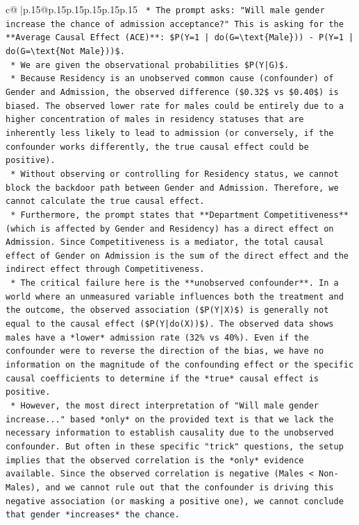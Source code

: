 \documentclass{article}
\begin{document}
{\begin{supertabular}{c@{$\;$}|p{.15\linewidth}@{}p{.15\linewidth}p{.15\linewidth}p{.15\linewidth}p{.15\linewidth}p{.15\linewidth}}
{{{\texttt{    *   The prompt asks: "Will male gender increase the chance of admission acceptance?" This is asking for the **Average Causal Effect (ACE)**: \$P(Y=1 | do(G=\textbackslash{}text\{Male\})) {-} P(Y=1 | do(G=\textbackslash{}text\{Not Male\}))\$.} \\
\texttt{    *   We are given the observational probabilities \$P(Y|G)\$.} \\
\texttt{    *   Because Residency is an unobserved common cause (confounder) of Gender and Admission, the observed difference (\$0.32\$ vs \$0.40\$) is biased. The observed lower rate for males could be entirely due to a higher concentration of males in residency statuses that are inherently less likely to lead to admission (or conversely, if the confounder works differently, the true causal effect could be positive).} \\
\texttt{    *   Without observing or controlling for Residency status, we cannot block the backdoor path between Gender and Admission. Therefore, we cannot calculate the true causal effect.} \\
\texttt{    *   Furthermore, the prompt states that **Department Competitiveness** (which is affected by Gender and Residency) has a direct effect on Admission. Since Competitiveness is a mediator, the total causal effect of Gender on Admission is the sum of the direct effect and the indirect effect through Competitiveness.} \\
\texttt{    *   The critical failure here is the **unobserved confounder**. In a world where an unmeasured variable influences both the treatment and the outcome, the observed association (\$P(Y|X)\$) is generally not equal to the causal effect (\$P(Y|do(X))\$). The observed data shows males have a *lower* admission rate (32\% vs 40\%). Even if the confounder were to reverse the direction of the bias, we have no information on the magnitude of the confounding effect or the specific causal coefficients to determine if the *true* causal effect is positive.} \\
\texttt{    *   However, the most direct interpretation of "Will male gender increase..." based *only* on the provided text is that we lack the necessary information to establish causality due to the unobserved confounder. But often in these specific "trick" questions, the setup implies that the observed correlation is the *only* evidence available. Since the observed correlation is negative (Males < Non{-}Males), and we cannot rule out that the confounder is driving this negative association (or masking a positive one), we cannot conclude that gender *increases* the chance.} \\
}}}
\end{supertabular}}
\end{document}
